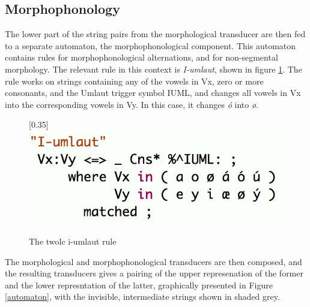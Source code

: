 \documentclass[11pt]{article}
\begin{document}
\subsection{Morphophonology}

The lower part of the string pairs from the morphological transducer are then fed to a separate automaton, the morphophonological component. This automaton contains rules for morphophonological alternations, and for non-segmental morphology. The relevant rule in this context is \textit{I-umlaut}, shown in figure \ref{twoliumlaut}. The rule works on strings containing any of the vowels in Vx, zero or more consonants, and the Umlaut trigger symbol IUML, and changes all vowels in Vx into the corresponding vowels in Vy. In this case, it changes \textit{ó} into \textit{ø}.
 
\begin{figure}[htbp]
\begin{center}
\scalebox{0.35}[0.35]{\includegraphics{img/twoliumlaut.png}}
\caption{The twolc i-umlaut rule}
\label{twoliumlaut}
\end{center}
\end{figure}

The morphological and morphophonological transducers are then composed, and the resulting transducers gives a pairing of the upper represenation of the former and the lower represntation of the latter, graphically presented in Figure \ref{automaton}, with the invisible, intermediate strings shown in shaded grey.
\end{document}
